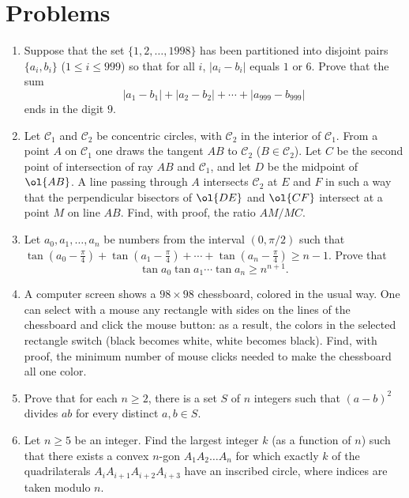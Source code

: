 \documentclass[11pt]{scrartcl}
\begin{document}
\section{Problems}
\begin{enumerate}[\bfseries 1.]
\item %
Suppose that the set $\{1,2,\dots, 1998\}$
has been partitioned into disjoint pairs $\{a_i,b_i\}$ ($1\leq i\leq 999$)
so that for all $i$, $|a_i-b_i|$ equals $1$ or $6$.
Prove that the sum
\[ |a_1-b_1|+|a_2-b_2|+\dotsb +|a_{999}-b_{999}|  \]
ends in the digit $9$.

\item %
Let $\mathcal C_1$ and $\mathcal C_2$ be concentric circles, with
$\mathcal C_2$ in the interior of $\mathcal C_1$.
From a point $A$ on $\mathcal C_1$ one draws the tangent $AB$
to $\mathcal C_2$ ($B\in \mathcal C_2$).
Let $C$ be the second point of intersection of ray $AB$ and
$\mathcal C_1$, and let $D$ be the midpoint of $\ol{AB}$.
A line passing through $A$ intersects $\mathcal C_2$ at $E$ and $F$
in such a way that the perpendicular bisectors of $\ol{DE}$ and $\ol{CF}$
intersect at a point $M$ on line $AB$.
Find, with proof, the ratio $AM/MC$.

\item %
Let $a_0,a_1,\dots ,a_n$ be numbers from the interval $(0,\pi/2)$
such that $\tan (a_0-\frac{\pi}{4})+ \tan (a_1-\frac{\pi}{4})
 + \dotsb +\tan (a_n-\frac{\pi}{4}) \ge  n-1$.
Prove that
\[ \tan a_0\tan a_1 \dotsm \tan a_n \ge n^{n+1}. \]

\item %
A computer screen shows a $98 \times 98$ chessboard, colored in the usual way.
One can select with a mouse any rectangle with sides on the lines
of the chessboard and click the mouse button:
as a result, the colors in the selected rectangle switch
(black becomes white, white becomes black).
Find, with proof, the minimum number of mouse clicks
needed to make the chessboard all one color.

\item %
Prove that for each $n\geq 2$,
there is a set $S$ of $n$ integers
such that $(a-b)^2$ divides $ab$ for every distinct $a,b\in S$.

\item %
Let $n \geq 5$ be an integer.
Find the largest integer $k$ (as a function of $n$)
such that there exists a convex $n$-gon $A_{1}A_{2}\dots A_{n}$
for which exactly $k$ of the quadrilaterals
$A_{i}A_{i+1}A_{i+2}A_{i+3}$ have an inscribed circle,
where indices are taken modulo $n$.

\end{enumerate}
\pagebreak
\end{document}
